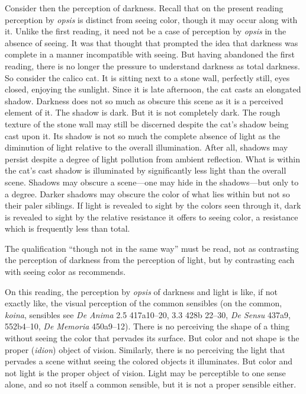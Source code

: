 Consider then the perception of darkness. Recall that on the present reading perception by \emph{opsis} is distinct from seeing color, though it may occur along with it. Unlike the first reading, it need not be a case of perception by \emph{opsis} in the absence of seeing. It was that thought that prompted the idea that darkness was complete in a manner incompatible with seeing. But having abandoned the first reading, there is no longer the pressure to understand darkness as total darkness. So consider the calico cat. It is sitting next to a stone wall, perfectly still, eyes closed, enjoying the sunlight. Since it is late afternoon, the cat casts an elongated shadow. Darkness does not so much as obscure this scene as it is a perceived element of it. The shadow is dark. But it is not completely dark. The rough texture of the stone wall may still be discerned despite the cat's shadow being cast upon it. Its shadow is not so much the complete absence of light as the diminution of light relative to the overall illumination. After all, shadows may persist despite a degree of light pollution from ambient reflection. What is within the cat's cast shadow is illuminated by significantly less light than the overall scene. Shadows may obscure a scene—one may hide in the shadows—but only to a degree. Darker shadows may obscure the color of what lies within but not so their paler siblings. If light is revealed to sight by the colors seen through it, dark is revealed to sight by the relative resistance it offers to seeing color, a resistance which is frequently less than total.

The qualification ``though not in the same way'' must be read, not as contrasting the perception of darkness from the perception of light, but by contrasting each with seeing color as \citet[275]{Ross:1961uq} recommends.

On this reading, the perception by \emph{opsis} of darkness and light is like, if not exactly like, the visual perception of the common sensibles (on the common, \emph{koina}, sensibles see \emph{De Anima} 2.5 417a10–20, 3.3 428b 22–30, \emph{De Sensu} 437a9, 552b4–10, \emph{De Memoria} 450a9–12). There is no perceiving the shape of a thing without seeing the color that pervades its surface. But color and not shape is the proper (\emph{idion}) object of vision. Similarly, there is no perceiving the light that pervades a scene withut seeing the colored objects it illuminates. But color and not light is the proper object of vision. Light may be perceptible to one sense alone, and so not itself a common sensible, but it is not a proper sensible either.


